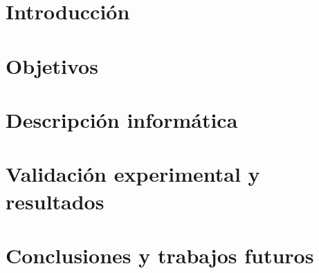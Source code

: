 \documentclass[12pt,twoside,titlepage]{report}
\newcommand\blankpage{%
    \newpage
    \null
    \thispagestyle{empty}%
    \newpage}
\begin{document}
\chapter{Introducción}



\pagestyle{fancy}


\setlength{\parskip}{0.75em}
\renewcommand{\baselinestretch}{1.25}
\setcounter{page}{1}






\chapter{Objetivos}



\blankpage

\chapter{Descripción informática}



\blankpage


% 


\chapter{Validación experimental y resultados}
\label{sec:resulObtenidos}



\blankpage


\chapter{Conclusiones y trabajos futuros}
\end{document}
